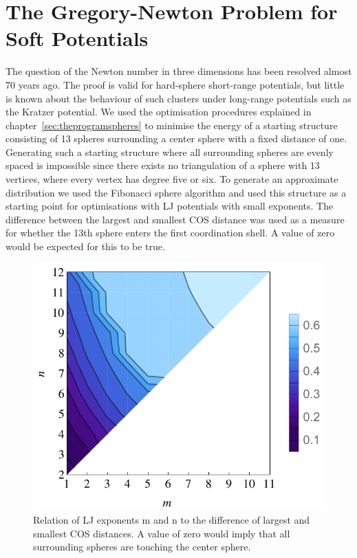 \section{The Gregory-Newton Problem for Soft Potentials}
\label{sec:thegregorynewtonproblemforsoftpotentials}

The question of the Newton number in three dimensions has been resolved almost
70 years ago\autocite{Schutte_ProblemdreizehnKugeln_1952}. The proof is valid
for hard-sphere short-range potentials, but little is known about the behaviour
of such clusters under long-range potentials such as the Kratzer
potential\autocite{Kratzer_ultrarotenRotationsspektrenHalogenwasserstoffe_1920}.
We used the optimisation procedures explained in
chapter~\ref{sec:theprogramspheres} to minimise the energy of a starting
structure consisting of 13 spheres surrounding a center sphere with a fixed
distance of one. Generating such a starting structure where all surrounding
spheres are evenly spaced is impossible since there exists no triangulation of
a sphere with 13 vertices, where every vertex has degree five or
six\autocite{Schwerdtfeger_topologyfullerenes_2015}. To generate an approximate
distribution we used the Fibonacci sphere
algorithm\autocite{Gonzalez_MeasurementAreasSphere_2010,Keinert_SphericalFibonacciMapping_2015}
and used this structure as a starting point for optimisations with \ac{LJ}
potentials with small exponents. The difference between the largest and
smallest \ac{COS} distance was used as a measure for whether the 13th sphere
enters the first coordination shell. A value of zero would be expected for this
to be true.

\begin{figure}
    \centering
    \includegraphics[width=.8\textwidth]{gregory-newton/N14.pdf}
    \caption{Relation of \acs{LJ} exponents m and n to the difference of
    largest and smallest \acs{COS} distances.  A value of zero would imply that
    all surrounding spheres are touching the center sphere.}
    \label{fig:gregorynewton-N14}
\end{figure}


